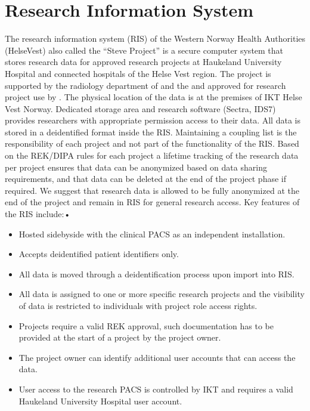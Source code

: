 \documentclass[letterpaper,10pt,english]{sphinxmanual}
\begin{document}
\section{Research Information System}
\label{\detokenize{EndUser/index:research-information-system}}
\sphinxAtStartPar
The research information system (RIS) of the Western Norway Health Authorities (Helse\sphinxhyphen{}Vest) also called the “Steve Project” is a secure computer system that stores
research data for approved research projects at Haukeland University Hospital and connected hospitals of the Helse Vest region. The project is supported by the
radiology department of  and the  and approved for research project use by . The physical location of the data is at the premises of IKT Helse Vest Norway. Dedicated storage area and research software (Sectra, IDS7) provides researchers with
appropriate permission access to their data. All data is stored in a de\sphinxhyphen{}identified format inside the RIS. Maintaining a coupling list is the responsibility of each project
and not part of the functionality of the RIS. Based on the REK/DIPA rules for each project a lifetime tracking of the research data
per project ensures that data can be anonymized based on data sharing requirements, and that data can be deleted at the end of the project phase \sphinxhyphen{} if
required. We suggest that research data is allowed to be fully anonymized at the end of the project and remain in RIS for general research access.
Key features of the RIS include:•
\begin{itemize}
\item {} 
\sphinxAtStartPar
Hosted side\sphinxhyphen{}by\sphinxhyphen{}side with the clinical PACS as an independent installation.

\item {} 
\sphinxAtStartPar
Accepts de\sphinxhyphen{}identified patient identifiers only.

\item {} 
\sphinxAtStartPar
All data is moved through a de\sphinxhyphen{}identification process upon import into RIS.

\item {} 
\sphinxAtStartPar
All data is assigned to one or more specific research projects and the visibility of data is restricted to individuals with project role access rights.

\item {} 
\sphinxAtStartPar
Projects require a valid REK approval, such documentation has to be provided at the start of a project by the project owner.

\item {} 
\sphinxAtStartPar
The project owner can identify additional user accounts that can access the data.

\item {} 
\sphinxAtStartPar
User access to the research PACS is controlled by IKT and requires a valid Haukeland University Hospital user account.

\end{itemize}
\end{document}
